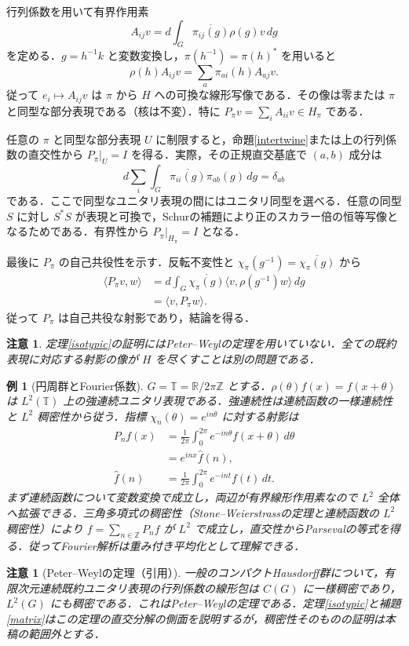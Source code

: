 \documentclass[a5paper,10pt,onecolumn]{jsarticle}
\makeatletter
\theoremstyle{mathnotetheorem}
\newtheorem{example}[theorem]{例}
\newtheorem{remark}[theorem]{注意}
\renewcommand{\proofname}{証明}
\renewenvironment{proof}[1][\proofname]{%
  \par\pushQED{\qed}\normalfont\topsep4\p@\@plus2\p@\relax
  \trivlist\item[\hskip\labelsep\bfseries #1]\ignorespaces
}{\popQED\endtrivlist\@endpefalse}
\newcommand{\R}{\mathbb{R}}
\newcommand{\T}{\mathbb T}
\newcommand{\ip}[2]{\langle #1,#2\rangle}
\makeatother
\begin{document}
\begin{proof}
行列係数を用いて有界作用素
\[
 A_{ij}v=d\int_G\overline{\pi_{ij}(g)}\rho(g)v\,dg
\]
を定める．$g=h^{-1}k$ と変数変換し，$\pi(h^{-1})=\pi(h)^*$ を用いると
\[
 \rho(h)A_{ij}v=\sum_a\pi_{ai}(h)A_{aj}v.
\]
従って $e_i\mapsto A_{ij}v$ は $\pi$ から $H$ への可換な線形写像である．その像は零または $\pi$ と同型な部分表現である（核は不変）．特に $P_\pi v=\sum_i A_{ii}v\in H_\pi$ である．

任意の $\pi$ と同型な部分表現 $U$ に制限すると，命題\ref{intertwine}または上の行列係数の直交性から $P_\pi|_U=I$ を得る．実際，その正規直交基底で $(a,b)$ 成分は
\[
 d\sum_i\int_G\overline{\pi_{ii}(g)}\pi_{ab}(g)\,dg
 =\delta_{ab}
\]
である．ここで同型なユニタリ表現の間にはユニタリ同型を選べる．任意の同型 $S$ に対し $S^*S$ が表現と可換で，Schurの補題により正のスカラー倍の恒等写像となるためである．有界性から $P_\pi|_{H_\pi}=I$ となる．

最後に $P_\pi$ の自己共役性を示す．反転不変性と $\chi_\pi(g^{-1})=\overline{\chi_\pi(g)}$ から
\begin{align*}
 \ip{P_\pi v}{w}
 &=d\int_G\overline{\chi_\pi(g)}\ip{v}{\rho(g^{-1})w}\,dg\\
 &=\ip{v}{P_\pi w}.
\end{align*}
従って $P_\pi$ は自己共役な射影であり，結論を得る．
\end{proof}
\begin{remark}
定理\ref{isotypic}の証明にはPeter--Weylの定理を用いていない．全ての既約表現に対応する射影の像が $H$ を尽くすことは別の問題である．
\end{remark}
\begin{example}[円周群とFourier係数]
$G=\T=\R/2\pi\mathbb Z$ とする．$\rho(\theta)f(x)=f(x+\theta)$ は $L^2(\T)$ 上の強連続ユニタリ表現である．強連続性は連続函数の一様連続性と $L^2$ 稠密性から従う．指標 $\chi_n(\theta)=e^{in\theta}$ に対する射影は
\begin{align*}
 P_nf(x)&=\frac1{2\pi}\int_0^{2\pi}e^{-in\theta}f(x+\theta)\,d\theta\\
 &=e^{inx}\widehat f(n),\\
 \widehat f(n)&=\frac1{2\pi}\int_0^{2\pi}e^{-int}f(t)\,dt.
\end{align*}
まず連続函数について変数変換で成立し，両辺が有界線形作用素なので $L^2$ 全体へ拡張できる．三角多項式の稠密性（Stone--Weierstrassの定理と連続函数の $L^2$ 稠密性）により $f=\sum_{n\in\mathbb Z}P_nf$ が $L^2$ で成立し，直交性からParsevalの等式を得る．従ってFourier解析は重み付き平均化として理解できる．
\end{example}
\begin{remark}[Peter--Weylの定理（引用）]
一般のコンパクトHausdorff群について，有限次元連続既約ユニタリ表現の行列係数の線形包は $C(G)$ に一様稠密であり，$L^2(G)$ にも稠密である．これはPeter--Weylの定理である．定理\ref{isotypic}と補題\ref{matrix}はこの定理の直交分解の側面を説明するが，稠密性そのものの証明は本稿の範囲外とする．
\end{remark}
\end{document}
